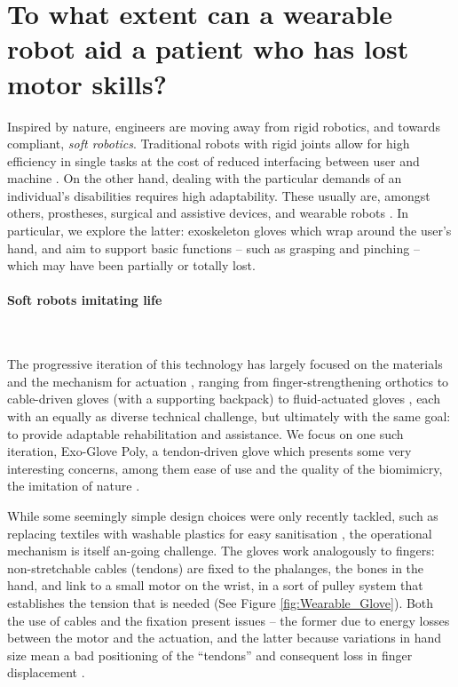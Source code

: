 \section*{To what extent can a wearable robot aid a patient who has lost motor skills?}

Inspired by nature, engineers are moving away from rigid robotics, and towards compliant, \textit{soft robotics}.
Traditional robots with rigid joints allow for high efficiency in single tasks at the cost of reduced interfacing between user and machine \citep{DanielaRus2015Dfac}.
On the other hand, dealing with the particular demands of an individual's disabilities requires high adaptability. These usually are, amongst others, prostheses, surgical and assistive devices, and wearable robots \citep{CianchettiMatteo2018Baos}.
In particular, we explore the latter: exoskeleton gloves which wrap around the user's hand, and aim to support basic functions -- such as grasping and pinching -- which may have been partially or totally lost.

\paragraph{Soft robots imitating life}
\

The progressive iteration of this technology has largely focused on the materials and the mechanism for actuation \citep{ShahidTalha2018MtSR,YeoJooChuan2016SRFS}, ranging from finger-strengthening orthotics to cable-driven gloves (with a supporting backpack) to fluid-actuated gloves \citep{CianchettiMatteo2018Baos,DelphMichaelA2013Asre}, each with an equally as diverse technical challenge, but ultimately with the same goal: to provide adaptable rehabilitation and assistance.
We focus on one such iteration, Exo-Glove Poly, a tendon-driven glove which presents some very interesting concerns, among them ease of use and the quality of the biomimicry, the imitation of nature \citep{KangB.B2012Ftij}.

While some seemingly simple design choices were only recently tackled, such as replacing textiles with washable plastics for easy sanitisation \citep{KangB.B2016IIC}, the operational mechanism is itself an-going challenge.
The gloves work analogously to fingers: non-stretchable cables (tendons) are fixed to the phalanges, the bones in the hand, and link to a small motor on the wrist, in a sort of pulley system that establishes the tension that is needed (See Figure \ref{fig:Wearable_Glove}).
Both the use of cables and the fixation present issues -- the former due to energy losses between the motor and the actuation, and the latter because variations in hand size mean a bad positioning of the ``tendons'' and consequent loss in finger displacement \citep{CianchettiMatteo2018Baos,InHyunki2011Jsau,KangB.B2012Ftij}.

